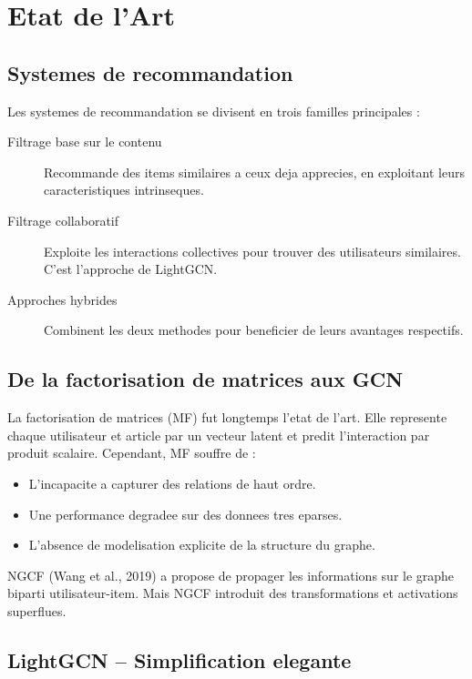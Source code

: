 \documentclass[12pt,a4paper]{report}
\begin{document}
\chapter{Etat de l'Art}

\section{Systemes de recommandation}

Les systemes de recommandation se divisent en trois familles
principales :

\begin{description}
  \item[Filtrage base sur le contenu] Recommande des items similaires
    a ceux deja apprecies, en exploitant leurs caracteristiques
    intrinseques.
  \item[Filtrage collaboratif] Exploite les interactions collectives
    pour trouver des utilisateurs similaires. C'est l'approche de
    LightGCN.
  \item[Approches hybrides] Combinent les deux methodes pour
    beneficier de leurs avantages respectifs.
\end{description}

\section{De la factorisation de matrices aux GCN}

La factorisation de matrices (MF) fut longtemps l'etat de l'art. Elle
represente chaque utilisateur et article par un vecteur latent et
predit l'interaction par produit scalaire. Cependant, MF souffre de :
\begin{itemize}
  \item L'incapacite a capturer des relations de haut ordre.
  \item Une performance degradee sur des donnees tres eparses.
  \item L'absence de modelisation explicite de la structure du graphe.
\end{itemize}

NGCF (Wang et al., 2019) a propose de propager les informations sur
le graphe biparti utilisateur-item. Mais NGCF introduit des
transformations et activations superflues.

\section{LightGCN -- Simplification elegante}
\end{document}
